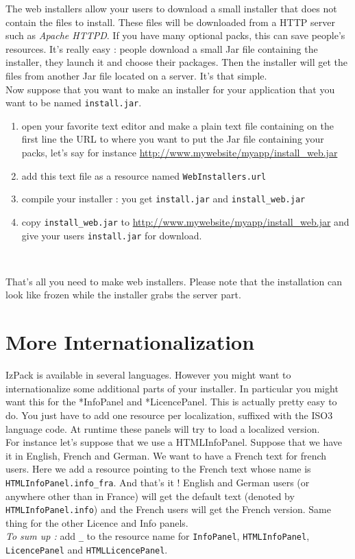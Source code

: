 The web installers allow your users to download a small installer that does not
contain the files to install. These files will be downloaded from a HTTP server
such as \textit{Apache HTTPD}. If you have many optional packs, this can save
people's resources. It's really easy : people download a small Jar
file containing the installer, they launch it and choose their
packages. Then the installer will get the files from another Jar file
located on a server. It's that simple.\\

Now suppose that you want to make an installer for your application
that you want to be named \texttt{install.jar}.
\begin{enumerate}
  \item open your favorite text editor and make a plain text file
  containing on the first line the URL to where you want to put the
  Jar file containing your packs, let's say for instance
  \url{http://www.mywebsite/myapp/install_web.jar}
  \item add this text file as a resource named
  \texttt{WebInstallers.url}
  \item compile your installer : you get \texttt{install.jar} and
  \texttt{install\_web.jar}
  \item copy \texttt{install\_web.jar} to
  \url{http://www.mywebsite/myapp/install_web.jar} and give your
  users \texttt{install.jar} for download.
\end{enumerate}\

That's all you need to make web installers.
Please note that the installation can look like frozen while the installer
grabs the server part.\\

\section{More Internationalization}

IzPack is available in several languages. However you might want to
internationalize some additional parts of your installer. In particular you
might want this for the *InfoPanel and *LicencePanel. This is actually pretty
easy to do. You just have to add one resource per localization, suffixed with the
ISO3 language code. At runtime these panels will try to load a localized version.\\

For instance let's suppose that we use a HTMLInfoPanel. Suppose that we have it
in English, French and German. We want to have a French text for french users.
Here we add a resource pointing to the French text whose name is
\texttt{HTMLInfoPanel.info\_fra}. And that's it ! English and German users (or
anywhere other than in France) will get the default text (denoted by 
\texttt{HTMLInfoPanel.info}) and the French users will get the French version.
Same thing for the other Licence and Info panels.\\

\noindent
\textit{To sum up :} add \texttt{\_<iso3 code>} to the resource name for
\texttt{InfoPanel}, \texttt{HTMLInfoPanel}, \texttt{LicencePanel} and
\texttt{HTMLLicencePanel}.\\
